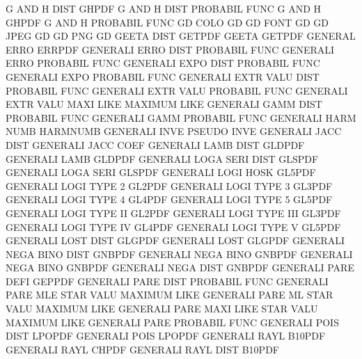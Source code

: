G        AND  H    DIST                 GHPDF
G        AND  H    DIST                 PROBABIL FUNC
G        AND  H                         GHPDF
G        AND  H                         PROBABIL FUNC
GD       COLO                           GD
GD       FONT                           GD
GD       JPEG                           GD
GD       PNG                            GD
GEETA    DIST                           GETPDF
GEETA                                   GETPDF
GENERAL  ERRO                           ERRPDF
GENERALI ERRO DIST                      PROBABIL FUNC
GENERALI ERRO                           PROBABIL FUNC
GENERALI EXPO DIST                      PROBABIL FUNC
GENERALI EXPO                           PROBABIL FUNC
GENERALI EXTR VALU DIST                 PROBABIL FUNC
GENERALI EXTR VALU                      PROBABIL FUNC
GENERALI EXTR VALU MAXI LIKE            MAXIMUM  LIKE
GENERALI GAMM DIST                      PROBABIL FUNC
GENERALI GAMM                           PROBABIL FUNC
GENERALI HARM NUMB                      HARMNUMB
GENERALI INVE                           PSEUDO   INVE
GENERALI JACC DIST                      GENERALI JACC COEF
GENERALI LAMB DIST                      GLDPDF
GENERALI LAMB                           GLDPDF
GENERALI LOGA SERI DIST                 GLSPDF
GENERALI LOGA SERI                      GLSPDF
GENERALI LOGI HOSK                      GL5PDF
GENERALI LOGI TYPE 2                    GL2PDF
GENERALI LOGI TYPE 3                    GL3PDF
GENERALI LOGI TYPE 4                    GL4PDF
GENERALI LOGI TYPE 5                    GL5PDF
GENERALI LOGI TYPE II                   GL2PDF
GENERALI LOGI TYPE III                  GL3PDF
GENERALI LOGI TYPE IV                   GL4PDF
GENERALI LOGI TYPE V                    GL5PDF
GENERALI LOST DIST                      GLGPDF
GENERALI LOST                           GLGPDF
GENERALI NEGA BINO DIST                 GNBPDF
GENERALI NEGA BINO                      GNBPDF
GENERALI NEGA BINO                      GNBPDF
GENERALI NEGA DIST                      GNBPDF
GENERALI PARE DEFI                      GEPPDF
GENERALI PARE DIST                      PROBABIL FUNC
GENERALI PARE MLE  STAR VALU            MAXIMUM  LIKE
GENERALI PARE ML   STAR VALU            MAXIMUM  LIKE
GENERALI PARE MAXI LIKE STAR VALU       MAXIMUM  LIKE
GENERALI PARE                           PROBABIL FUNC
GENERALI POIS DIST                      LPOPDF
GENERALI POIS                           LPOPDF
GENERALI RAYL                           B10PDF
GENERALI RAYL                           CHPDF
GENERALI RAYL DIST                      B10PDF
